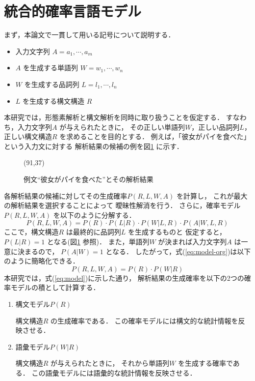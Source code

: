 \section{統合的確率言語モデル}
\label{sec:model}

まず，本論文で一貫して用いる記号について説明する．

\begin{itemize}
\item 入力文字列 $A=a_1,\cdots,a_m$
\item $A$ を生成する単語列 $W=w_1,\cdots,w_n$
\item $W$ を生成する品詞列 $L=l_1,\cdots,l_n$
\item $L$ を生成する構文構造 $R$
\end{itemize}
本研究では，形態素解析と構文解析を同時に取り扱うことを仮定する．
すなわち，入力文字列$A$ が与えられたときに，
その正しい単語列$W$，正しい品詞列$L$，
正しい構文構造$R$ を求めることを目的とする．
例えば，「彼女がパイを食べた」という入力文に対する
解析結果の候補の例を図\ref{fig:examsent} に示す．

\begin{figure}[htbp]
  \begin{center}
    \leavevmode
    \atari(91,37)


    \caption{例文``彼女がパイを食べた''とその解析結果}
    \label{fig:examsent}
  \end{center}
\end{figure}

各解析結果の候補に対してその生成確率$P(R,L,W,A)$ を計算し，
これが最大の解析結果を選択することによって
曖昧性解消を行う．
さらに，確率モデル$P(R,L,W,A)$ を以下のように分解する．
\begin{equation}
  \label{eq:model-org}
  P(R,L,W,A) = P(R) \cdot P(L|R) \cdot P(W|L,R) \cdot P(A|W,L,R)
\end{equation}
ここで，構文構造$R$ は最終的に品詞列$L$ を生成するものと
仮定すると，$P(L|R) = 1$ となる(図\ref{fig:examsent} 参照)．
また，単語列$W$ が決まれば入力文字列$A$ は一意に決まるので，
$P(A|W)=1$ となる．
したがって，式(\ref{eq:model-org})は以下のように簡略化できる．
\begin{equation}
  \label{eq:model}
  P(R,L,W,A) = P(R) \cdot P(W|R)
\end{equation}
本研究では，式(\ref{eq:model})に示した通り，
解析結果の生成確率を以下の2つの確率モデルの積として計算する．
\begin{enumerate}
\item 構文モデル$P(R)$

  構文構造$R$ の生成確率である．
  この確率モデルには構文的な統計情報を反映させる．

\item 語彙モデル$P(W|R)$

  構文構造$R$ が与えられたときに，
  それから単語列$W$ を生成する確率である．
  この語彙モデルには語彙的な統計情報を反映させる．
\end{enumerate}
